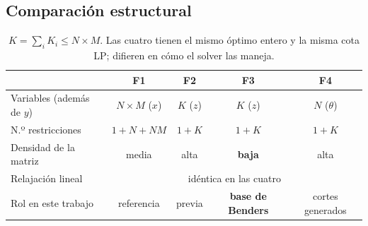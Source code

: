 \subsection{Comparación estructural}
\begin{table}[h]\centering
\begin{tabular}{lcccc}
\toprule
 & \textbf{F1} & \textbf{F2} & \textbf{F3} & \textbf{F4} \\
\midrule
Variables (además de $y$) & $N\!\times\!M$ ($x$) & $K$ ($z$) & $K$ ($z$) & $N$ ($\theta$) \\
N.º restricciones & $1+N+NM$ & $1+K$ & $1+K$ & $1+K$ \\
Densidad de la matriz & media & alta & \textbf{baja} & alta \\
Relajación lineal & \multicolumn{4}{c}{idéntica en las cuatro} \\
Rol en este trabajo & referencia & previa & \textbf{base de Benders} & cortes generados \\
\bottomrule
\end{tabular}
\caption{$K=\sum_i K_i\le N\times M$. Las cuatro tienen el mismo óptimo entero y la misma cota LP;
difieren en cómo el solver las maneja.}
\end{table}
